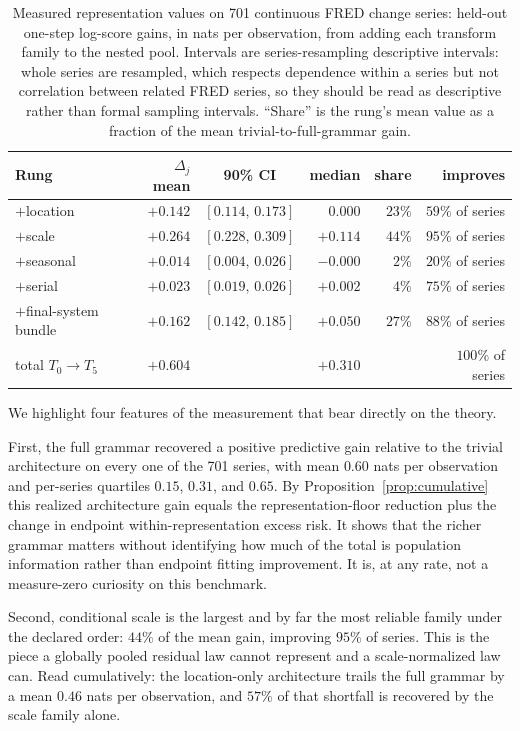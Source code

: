 \documentclass[11pt]{article}
\theoremstyle{remark}
\begin{document}
\begin{table}[t]
\centering
\begin{tabular}{lrcrrr}
\toprule
Rung & $\Delta_j$ mean & 90\% CI & median & share & improves\\
\midrule
$+$location & $+0.142$ & $[0.114,\,0.173]$ & $0.000$ & $23\%$ & $59\%$ of series\\
$+$scale & $+0.264$ & $[0.228,\,0.309]$ & $+0.114$ & $44\%$ & $95\%$ of series\\
$+$seasonal & $+0.014$ & $[0.004,\,0.026]$ & $-0.000$ & $2\%$ & $20\%$ of series\\
$+$serial & $+0.023$ & $[0.019,\,0.026]$ & $+0.002$ & $4\%$ & $75\%$ of series\\
$+$final-system bundle & $+0.162$ & $[0.142,\,0.185]$ & $+0.050$ & $27\%$ & $88\%$ of series\\
\midrule
total $T_0\to T_5$ & $+0.604$ & & $+0.310$ & & $100\%$ of series\\
\bottomrule
\end{tabular}
\caption{Measured representation values on 701 continuous FRED change series: held-out one-step
log-score gains, in nats per observation, from adding each transform family to the nested pool.
Intervals are series-resampling descriptive intervals: whole series are resampled, which
respects dependence within a series but not correlation between related FRED series, so they
should be read as descriptive rather than formal sampling intervals. ``Share'' is the rung's mean value as a fraction of the mean
trivial-to-full-grammar gain.}
\label{tab:ladder}
\end{table}

We highlight four features of the measurement that bear directly on the theory.

First, the full grammar recovered a positive predictive gain relative to the trivial
architecture on every one of the 701 series, with mean $0.60$ nats per observation and
per-series quartiles $0.15$, $0.31$, and $0.65$. By Proposition~\ref{prop:cumulative} this realized architecture gain equals the
representation-floor reduction plus the change in endpoint within-representation excess
risk. It shows that the richer grammar matters without identifying how much of the total is
population information rather than endpoint fitting improvement. It is, at any rate, not a
measure-zero curiosity on this benchmark.

Second, conditional scale is the largest and by far the most reliable family under the declared
order: $44\%$ of the mean gain, improving $95\%$ of series. This is the piece a globally pooled
residual law cannot represent and a scale-normalized law can. Read cumulatively: the
location-only architecture trails the full grammar by a mean $0.46$ nats per observation, and
$57\%$ of that shortfall is recovered by the scale family alone.
\end{document}
